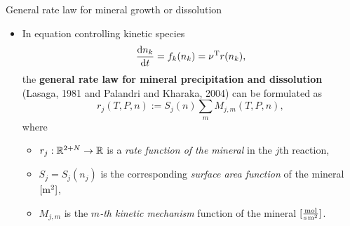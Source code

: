 %
%
\begin{frame}{General rate law for mineral growth or dissolution}
	\begin{itemize}
       \item In equation controlling kinetic species 
       $$\frac{{\rm d} n_k}{{\rm d} t} = f_k(n_k) = \nu^{\rm T} r(n_k),$$
       the \alert{\bf general rate law for mineral precipitation and dissolution} (Lasaga, 1981 and Palandri
       and Kharaka, 2004) can be formulated as
		\[
		r_{j}(T,P, n):= S_{j}(n)\sum_{m} M_{j,m}(T,P,n),
		\]
		where
		\begin{itemize}
			\item $r_{j}:\mathbb{R}^{2+N}\rightarrow\text{\ensuremath{\mathbb{R}}}$ is a {\it rate function of the mineral} in the $j$th reaction,
			\item $S_{j} = S_{j}(n_j)$ is the corresponding {\it surface area function} of the mineral $[{\rm m^2}]$,
			\item $M_{j, m}$ is the {\it $m$-th kinetic mechanism} function of the mineral $[{\rm \tfrac{mol}{s \, m^2}}]$.
		\end{itemize}
	\end{itemize}

\end{frame}	
%
